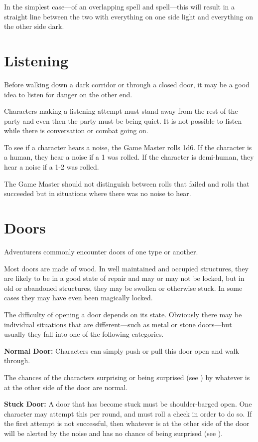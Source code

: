 \begin{multicols*}{2}
In the simplest case—of an overlapping  spell and  spell—this will result in a straight line between the two with everything on one side light and everything on the other side dark.

\section{Listening}
Before walking down a dark corridor or through a closed door, it may be a good idea to listen for danger on the other end.

Characters making a listening attempt must stand away from the rest of the party and even then the party must be being quiet. It is not possible to listen while there is conversation or combat going on.

To see if a character hears a noise, the Game Master rolls 1d6. If the character is a human, they hear a noise if a 1 was rolled. If the character is demi-human, they hear a noise if a 1-2 was rolled.

The Game Master should not distinguish between rolls that failed and rolls that succeeded but in situations where there was no noise to hear.

\section{Doors}\label{sec:Doors}
Adventurers commonly encounter doors of one type or another.

Most doors are made of wood. In well maintained and occupied structures, they are likely to be in a good state of repair and may or may not be locked, but in old or abandoned structures, they may be swollen or otherwise stuck. In some cases they may have even been magically locked.

The difficulty of opening a door depends on its state. Obviously there may be individual situations that are different—such as metal or stone doors—but usually they fall into one of the following categories.

\textbf{Normal Door:} Characters can simply push or pull this door open and walk through.

The chances of the characters surprising or being surprised (see ) by whatever is at the other side of the door are normal.

\textbf{Stuck Door:} A door that has become stuck must be shoulder-barged open. One character may attempt this per round, and must roll a  check in order to do so. If the first attempt is not successful, then whatever is at the other side of the door will be alerted by the noise and has no chance of being surprised (see ).


\end{multicols*}
